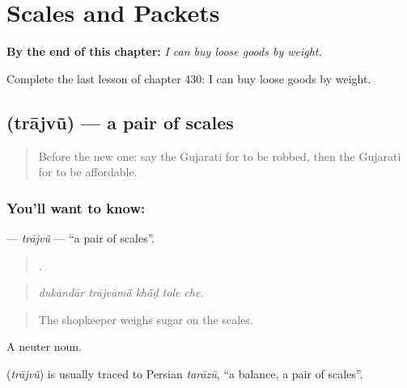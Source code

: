 
\chapter{Scales and Packets}
\label{ch:gu-scales-and-packets}

\begin{chapteropening}
\textbf{By the end of this chapter:} \emph{I can buy loose goods by weight.}

Complete the last lesson of chapter 430: I can buy loose goods by weight.
\end{chapteropening}

\section[\texorpdfstring{\gu{ત્રાજવું} (trājvũ)}{ત્રાજવું (trājvũ)}]{ (trājvũ) — a pair of scales}

\label{lesson:GU-C430-trajvu}



\begin{quote}
Before the new one: say the Gujarati for to be robbed, then the Gujarati for to be affordable.
\end{quote}

\subsection*{You'll want to know: }
\textbf{} — \emph{trājvũ} — \textquotedblleft{}a pair of scales\textquotedblright{}.

\begin{quote}
    .
\end{quote}

\begin{quote}
\emph{dukāndār trājvāmā̃ khā̃ḍ tole che.}
\end{quote}

\begin{quote}
The shopkeeper weighs sugar on the scales.
\end{quote}

A neuter noun.

\begin{cousinweb}
\textbf{} (\emph{trājvũ}) is usually traced to Persian \emph{tarāzū}, \textquotedblleft{}a balance, a pair of scales\textquotedblright{}.
\end{cousinweb}

